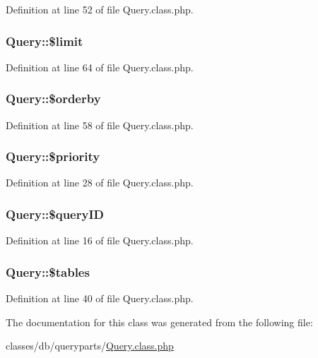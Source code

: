 Definition at line 52 of file Query.\-class.\-php.

\hypertarget{classQuery_abe481cf8b7f42b513a4f64cf7fb0ffea}{
\subsubsection[{\$limit}]{\setlength{\rightskip}{0pt plus 5cm}Query\-::\$limit}}\label{classQuery_abe481cf8b7f42b513a4f64cf7fb0ffea}


Definition at line 64 of file Query.\-class.\-php.

\hypertarget{classQuery_aa955216a83dfe57cdd9600b44b38ebac}{
\subsubsection[{\$orderby}]{\setlength{\rightskip}{0pt plus 5cm}Query\-::\$orderby}}\label{classQuery_aa955216a83dfe57cdd9600b44b38ebac}


Definition at line 58 of file Query.\-class.\-php.

\hypertarget{classQuery_a4d64f61fd525a70ebc2aaa6ab8291e20}{
\subsubsection[{\$priority}]{\setlength{\rightskip}{0pt plus 5cm}Query\-::\$priority}}\label{classQuery_a4d64f61fd525a70ebc2aaa6ab8291e20}


Definition at line 28 of file Query.\-class.\-php.

\hypertarget{classQuery_a67666b2fcd6c60e73d8329f7d22044dc}{
\subsubsection[{\$query\-I\-D}]{\setlength{\rightskip}{0pt plus 5cm}Query\-::\$query\-I\-D}}\label{classQuery_a67666b2fcd6c60e73d8329f7d22044dc}


Definition at line 16 of file Query.\-class.\-php.

\hypertarget{classQuery_a5c74163d1615b141456b123c11fa9d92}{
\subsubsection[{\$tables}]{\setlength{\rightskip}{0pt plus 5cm}Query\-::\$tables}}\label{classQuery_a5c74163d1615b141456b123c11fa9d92}


Definition at line 40 of file Query.\-class.\-php.



The documentation for this class was generated from the following file\-:\begin{DoxyCompactItemize}
\item 
classes/db/queryparts/\hyperlink{Query_8class_8php}{Query.\-class.\-php}\end{DoxyCompactItemize}
